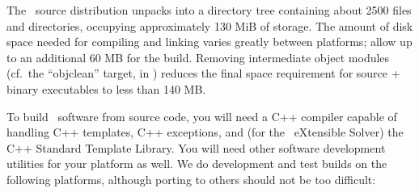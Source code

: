The \OOMMF\ source distribution unpacks into a directory tree containing
about 2500 files and directories, occupying approximately 130 MiB of
storage.  The amount of disk space needed for compiling and linking
varies greatly between platforms; allow up to an additional 60 MB for
the build.  Removing intermediate object modules (cf.\ the 
``objclean'' target, in   ) reduces the final space
requirement for source + binary executables to less than 140 MB.

To build \OOMMF\ software from source code, you will
need a C++ compiler capable of handling
C++ templates, C++ exceptions, and (for the \OOMMF\ eXtensible Solver)
the C++ Standard Template Library.  You will need other software
development utilities for your platform as well.  
We do development and
test builds on the following platforms, although porting to others
should not be too difficult:

